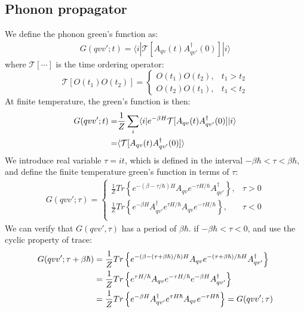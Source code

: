 \documentclass{article}
\begin{document}
\subsection{Phonon propagator}
We define the phonon green's function as:
\begin{align}
    G(qvv';t) = \langle i | \mathcal{T}[A_{qv}(t)A_{qv'}^{\dagger}(0)]| i \rangle
\end{align}
where $\mathcal{T}[\cdots]$ is the time ordering operator:
\begin{equation}
    \mathcal{T}[O(t_1)O(t_2)] = 
    \begin{cases}
        O(t_1)O(t_2), &t_1 > t_2\\
        O(t_2)O(t_1), &t_1 < t_2 
    \end{cases}
\end{equation}
At finite temperature, the green's function is then:
\begin{align}
    G(qvv';t) =& \frac{1}{Z} \sum_i \langle i | e^{-\beta H} \mathcal{T}[A_{qv}(t)A_{qv'}^{\dagger}(0)]| i \rangle \notag \\
              =& \langle \mathcal{T}[A_{qv}(t)A_{qv'}^{\dagger}(0)] \rangle
\end{align}
We introduce real variable $\tau = it $, which is defined in the interval $-\beta \hbar < \tau < \beta \hbar$, and define the 
finite temperature green's function in terms of $\tau$:
\begin{align}
    G(qvv';\tau) = 
    \begin{cases}
        \frac{1}{Z} Tr\left\{ e^{-(\beta-\tau/\hbar)H} A_{qv} e^{-\tau H/\hbar } A_{qv'}^{\dagger} \right\}, &\tau > 0 \\
        \frac{1}{Z} Tr\left\{ e^{-\beta H} A_{qv'}^{\dagger} e^{\tau H/\hbar } A_{qv} e^{- \tau H/\hbar } \right\}, &\tau < 0 \\
    \end{cases}
\end{align}
We can verify that $G(qvv',\tau)$ has a period of $\beta \hbar$. if $-\beta \hbar < \tau < 0$, and use the cyclic property 
of trace:
\begin{align}
    G(qvv';\tau + \beta \hbar) &= \frac{1}{Z} Tr\left\{ e^{-(\beta-(\tau + \beta \hbar)/\hbar)H} A_{qv} e^{-(\tau + \beta \hbar)/\hbar H} A_{qv'}^{\dagger} \right\} \notag \\
                                &= \frac{1}{Z} Tr\left\{ e^{\tau H/\hbar} A_{qv} e^{-\tau H /\hbar} e^{-\beta H} A_{qv'}^{\dagger} \right\} \notag \\
                                &= \frac{1}{Z} Tr\left\{ e^{-\beta H} A_{qv'}^{\dagger} e^{\tau H\hbar } A_{qv} e^{-\tau H\hbar } \right\} = G(qvv';\tau ) 
\end{align}
\end{document}
